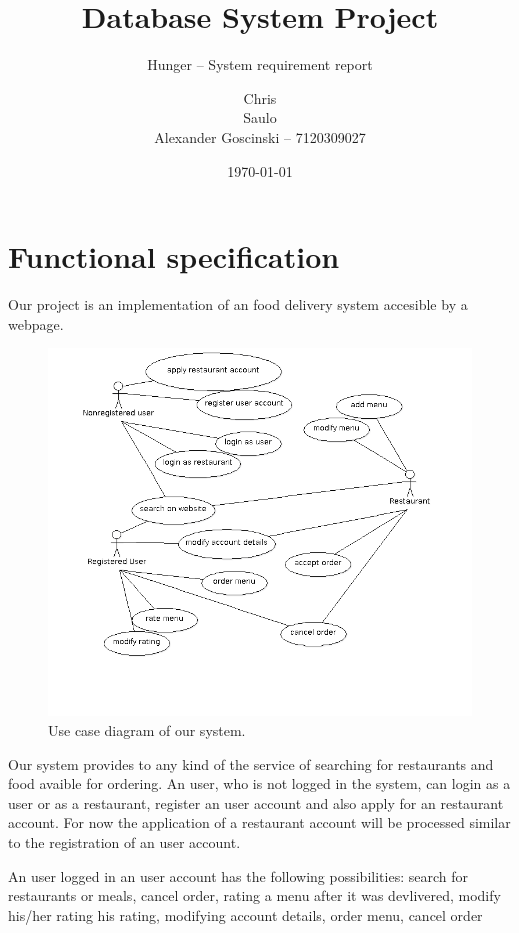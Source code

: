 \documentclass[parskip=half, a4paper]{scrartcl}
\begin{document}
\title{Database System Project}
\subtitle{Hunger -- System requirement report}
\author{Chris\\
		Saulo \\
		Alexander Goscinski -- 7120309027}
\date{\today}
\maketitle

\section{Functional specification}
Our project is an implementation of an food delivery system accesible by
a webpage. 
\begin{figure}[h]
	\centering
		\includegraphics[scale=0.4]{UseCaseDiagramHunger.png}
	\caption{Use case diagram of our system.}
\end{figure}
Our system provides to any kind of the
service of searching for restaurants and food avaible for ordering. An user, who is not
logged in the system, can login as a user or
as a restaurant, register an user account and also apply for an restaurant account.
For now the application of a restaurant account will be processed similar to the
registration of an user account.

An user logged in an user account has the following possibilities: search
for restaurants or meals, cancel order, rating a menu after it was
devlivered, modify his/her rating his rating, modifying account details,
order menu, cancel order
\end{document}
